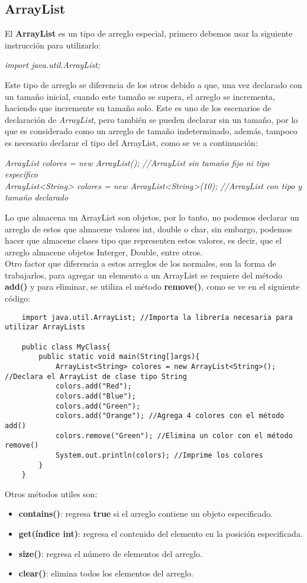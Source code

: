 \subsection{ArrayList}
El \textbf{ArrayList} es un tipo de arreglo especial, primero debemos usar la siguiente instrucción para utilizarlo:\begin{center}\textit{import java.util.ArrayList;}\end{center}
Este tipo de arreglo se diferencia de los otros debido a que, una vez declarado con un tamaño inicial, cuando este tamaño se supera, el arreglo se incrementa, haciendo que incremente su tamaño solo. Este es uno de los escenarios de declaración de \textit{ArrayList}, pero también se pueden declarar sin un tamaño, por lo que es considerado como un arreglo de tamaño indeterminado, además, tampoco es necesario declarar el tipo del ArrayList, como se ve a continuación:\begin{center}\textit{ArrayList colores = new ArrayList(); //ArrayList sin tamaño fijo ni tipo específico\\ArrayList<String> colores = new ArrayList<String>(10); //ArrayList con tipo y tamaño declarado}\end{center}
Lo que almacena un ArrayList son objetos, por lo tanto, no podemos declarar un arreglo de estos que almacene valores int, double o char, sin embargo, podemos hacer que almacene clases tipo que representen estos valores, es decir, que el arreglo almacene objetos Interger, Double, entre otros.\\
Otro factor que diferencia a estos arreglos de los normales, son la forma de trabajarlos, para agregar un elemento a un ArrayList se requiere del método \textbf{add()} y para eliminar, se utiliza el método \textbf{remove()}, como se ve en el siguiente código:
\begin{lstlisting}
    import java.util.ArrayList; //Importa la librería necesaria para utilizar ArrayLists
    
    public class MyClass{
        public static void main(String[]args){
            ArrayList<String> colores = new ArrayList<String>(); //Declara el ArrayList de clase tipo String
            colors.add("Red");
            colors.add("Blue");
            colors.add("Green");
            colors.add("Orange"); //Agrega 4 colores con el método add()
            colors.remove("Green"); //Elimina un color con el método remove()
            System.out.println(colors); //Imprime los colores
        }
    }
\end{lstlisting}
Otros métodos utiles son:
\begin{itemize}
    \item \textbf{contains()}: regresa \textbf{true} si el arreglo contiene un objeto especificado.
    \item \textbf{get(índice int)}: regresa el contenido del elemento en la posición especificada. 
    \item \textbf{size()}: regresa el número de elementos del arreglo.
    \item \textbf{clear()}: elimina todos los elementos del arreglo.
\end{itemize}

